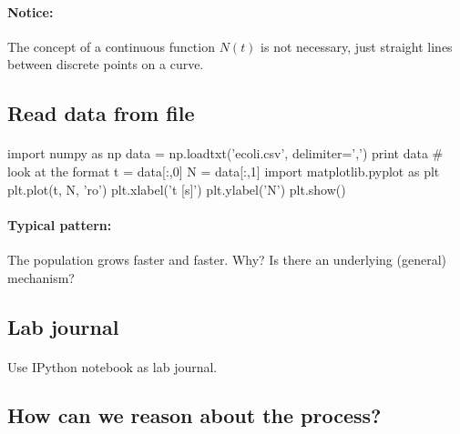 \documentclass[%
twoside,                 %
final,                   %
10pt]{article}
\begin{document}
\noindent




\paragraph{Notice:}
The concept of a continuous function $N(t)$ is not necessary,
just straight lines between discrete points on a curve.



\subsection{Read data from file}


\paragraph{}
\bpypro
import numpy as np
data = np.loadtxt('ecoli.csv', delimiter=',')
print data  # look at the format
t = data[:,0]
N = data[:,1]
import matplotlib.pyplot as plt
plt.plot(t, N, 'ro')
plt.xlabel('t [s]')
plt.ylabel('N')
plt.show()
\epypro




\paragraph{Typical pattern:}
The population grows faster and faster. Why? Is there an
underlying (general) mechanism?



\subsection{Lab journal}


\paragraph{}
Use IPython notebook as lab journal.




\subsection{How can we reason about the process?}
\end{document}
